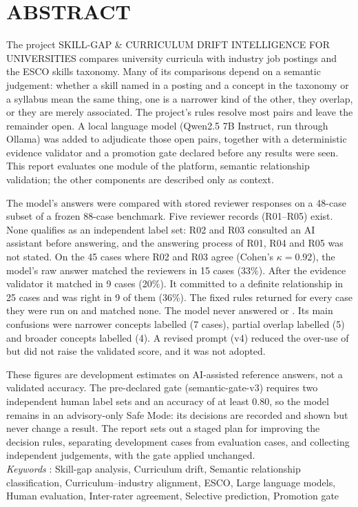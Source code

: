 \clearpage
{}
{}
\chapter*{ABSTRACT}
The project SKILL-GAP \& CURRICULUM DRIFT INTELLIGENCE FOR UNIVERSITIES compares university curricula with industry job postings and the ESCO skills taxonomy. Many of its comparisons depend on a semantic judgement: whether a skill named in a posting and a concept in the taxonomy or a syllabus mean the same thing, one is a narrower kind of the other, they overlap, or they are merely associated. The project's rules resolve most pairs and leave the remainder open. A local language model (Qwen2.5 7B Instruct, run through Ollama) was added to adjudicate those open pairs, together with a deterministic evidence validator and a promotion gate declared before any results were seen. This report evaluates one module of the platform, semantic relationship validation; the other components are described only as context.

The model's answers were compared with stored reviewer responses on a 48-case subset of a frozen 88-case benchmark. Five reviewer records (R01--R05) exist. None qualifies as an independent label set: R02 and R03 consulted an AI assistant before answering, and the answering process of R01, R04 and R05 was not stated. On the 45 cases where R02 and R03 agree (Cohen's $\kappa = 0.92$), the model's raw answer matched the reviewers in 15 cases (33\%). After the evidence validator it matched in 9 cases (20\%). It committed to a definite relationship in 25 cases and was right in 9 of them (36\%). The fixed rules returned \AM{} for every case they were run on and matched none. The model never answered \PA{} or \CH{}. Its main confusions were narrower concepts labelled \SC{} (7 cases), partial overlap labelled \SC{} (5) and broader concepts labelled \RE{} (4). A revised prompt (v4) reduced the over-use of \SC{} but did not raise the validated score, and it was not adopted.

These figures are development estimates on AI-assisted reference answers, not a validated accuracy. The pre-declared gate (semantic-gate-v3) requires two independent human label sets and an accuracy of at least 0.80, so the model remains in an advisory-only Safe Mode: its decisions are recorded and shown but never change a result. The report sets out a staged plan for improving the decision rules, separating development cases from evaluation cases, and collecting independent judgements, with the gate applied unchanged.
\\

\textit{Keywords} : Skill-gap analysis, Curriculum drift, Semantic relationship classification, Curriculum--industry alignment, ESCO, Large language models, Human evaluation, Inter-rater agreement, Selective prediction, Promotion gate
